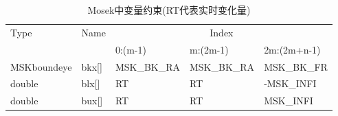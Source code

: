 \begin{table}[htbp]
  \caption{Mosek中变量约束(RT代表实时变化量)}
  \centering
  \begin{tabular}{@{}lllll@{}}
    \toprule
    \multirow{2}{*}{Type} & \multirow{2}{*}{Name} & \multicolumn{3}{c}{Index}               \\ \cmidrule(l){3-5} &               & 0:(m-1)               & m:(2m-1)    & 2m:(2m+n-1) \\ \cmidrule(r){1-2}
    MSKboundeye           & bkx{[}{]}             & MSK\_BK\_RA & MSK\_BK\_RA & MSK\_BK\_FR \\
    double                & blx{[}{]}             & RT   & RT    & -MSK\_INFI  \\
    double                & bux{[}{]}             & RT   & RT    & MSK\_INFI   \\ \bottomrule
    \end{tabular}
  \label{tab:mosekvariablebound}
\end{table}

